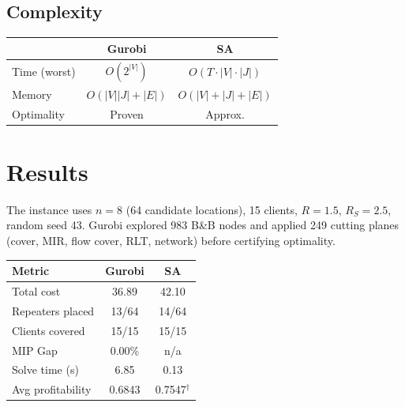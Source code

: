 \documentclass[10pt,a4paper,twocolumn]{article}
\begin{document}
\subsection{Complexity}

\begin{center}
\renewcommand{\arraystretch}{1.12}
\fontsize{7.5pt}{9pt}\selectfont
\begin{tabular}{@{}lcc@{}}
\toprule
& \textbf{Gurobi} & \textbf{SA} \\
\midrule
Time (worst) & $O(2^{|V|})$ & $O(T\cdot|V|\cdot|J|)$ \\
Memory       & $O(|V||J|+|E|)$ & $O(|V|+|J|+|E|)$ \\
Optimality   & Proven & Approx. \\
\bottomrule
\end{tabular}
\end{center}

\section{Results}

The instance uses $n{=}8$ (64 candidate locations), 15 clients,
$R{=}1.5$, $R_S{=}2.5$, random seed 43. Gurobi explored 983 B\&B
nodes and applied 249 cutting planes (cover, MIR, flow cover, RLT,
network) before certifying optimality.

\begin{center}
\renewcommand{\arraystretch}{1.25}
\fontsize{7.5pt}{9pt}\selectfont
\begin{tabular}{@{}lcc@{}}
\toprule
\textbf{Metric} & \textbf{Gurobi} & \textbf{SA} \\
\midrule
Total cost           & 36.89  & 42.10  \\
Repeaters placed     & 13/64  & 14/64  \\
Clients covered      & 15/15  & 15/15  \\
MIP Gap              & 0.00\% & n/a    \\
Solve time (s)       & 6.85   & 0.13   \\
Avg profitability    & 0.6843 & 0.7547$^\dagger$ \\
\bottomrule
\end{tabular}
\end{center}

\end{document}
